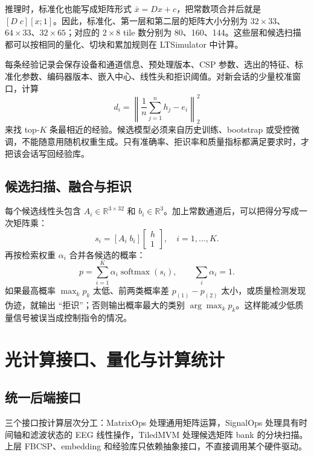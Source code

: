 \documentclass[
    TwoSide=false,
    Degree=graduate,
    GradLevel=master,
    Type=thesis,
    Title={光电混合运动想象脑机接口技术文档}
]{zjuthesis}
\begin{document}
推理时，标准化也能写成矩阵形式 $\bar{x}=D x+c$，把常数项合并后就是 $[D\;c][x;1]$。因此，标准化、第一层和第二层的矩阵大小分别为 $32\times33$、$64\times33$、$32\times65$；对应的 $2\times8$ tile 数分别为 80、160、144。这些层和候选扫描都可以按相同的量化、切块和累加规则在 LTSimulator 中计算。

每条经验记录会保存设备和通道信息、预处理版本、CSP 参数、选出的特征、标准化参数、编码器版本、嵌入中心、线性头和拒识阈值。对新会话的少量校准窗口，计算
\begin{equation}
d_i=\left\|\frac{1}{n}\sum_{j=1}^{n}h_j-e_i\right\|_2^2
\end{equation}
来找 top-$K$ 条最相近的经验。候选模型必须来自历史训练、bootstrap 或受控微调，不能随意用随机权重生成。只有准确率、拒识率和质量指标都满足要求时，才把该会话写回经验库。

\section{候选扫描、融合与拒识}
每个候选线性头包含 $A_i\in\mathbb{R}^{3\times32}$ 和 $b_i\in\mathbb{R}^{3}$。加上常数通道后，可以把得分写成一次矩阵乘：
\begin{equation}\label{eq:scan}
s_i=\left[A_i\;b_i\right]\begin{bmatrix}h\\1\end{bmatrix},\quad i=1,\ldots,K.
\end{equation}
再按检索权重 $\alpha_i$ 合并各候选的概率：
\begin{equation}
p=\sum_{i=1}^{K}\alpha_i\operatorname{softmax}(s_i),\qquad \sum_i\alpha_i=1.
\end{equation}
如果最高概率 $\max_k p_k$ 太低、前两类概率差 $p_{(1)}-p_{(2)}$ 太小，或质量检测发现伪迹，就输出 ``拒识''；否则输出概率最大的类别 $\arg\max_kp_k$。这样能减少低质量信号被误当成控制指令的情况。

\chapter{光计算接口、量化与计算统计}
\section{统一后端接口}
三个接口按计算层次分工：MatrixOps 处理通用矩阵运算，SignalOps 处理具有时间轴和滤波状态的 EEG 线性操作，TiledMVM 处理候选矩阵 bank 的分块扫描。上层 FBCSP、embedding 和经验库只依赖抽象接口，不直接调用某个硬件驱动。
\end{document}
